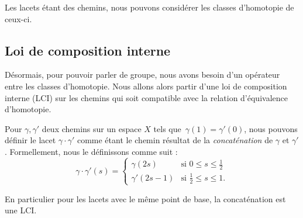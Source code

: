 Les lacets étant des chemins, nous pouvons considérer les classes d'homotopie de ceux-ci.

\subsection{Loi de composition interne}

Désormais, pour pouvoir parler de groupe, nous avons besoin d'un opérateur entre les classes d'homotopie. Nous allons alors partir d'une loi de composition interne (LCI) sur les chemins qui soit compatible avec la relation d'équivalence d'homotopie.

\begin{figure}
    \centering
\end{figure}

\phantom{}
\begin{definition}
Pour $\gamma,\gamma'$ deux chemins sur un espace $X$ tels que~$\gamma(1)=\gamma'(0)$, nous pouvons définir le lacet $\gamma\cdot\gamma'$ comme étant le chemin résultat de la \emph{concaténation} de $\gamma$ et $\gamma'$. Formellement, nous le définissons comme suit : \[\gamma\cdot \gamma'(s)=\left\{\begin{matrix}
\gamma(2s)&\text{si }0\leq s\leq \frac{1}{2}\\ 
\gamma'(2s-1)&\text{si }\frac{1}{2}\leq s\leq 1.
\end{matrix}\right.\]

En particulier pour les lacets avec le même point de base, la concaténation est une LCI.
\end{definition}


